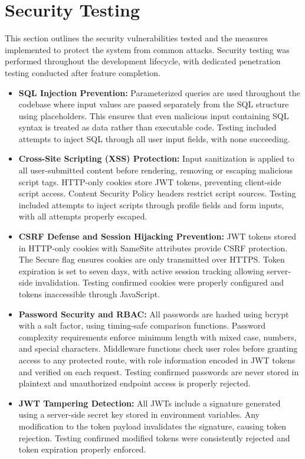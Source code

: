 \section{Security Testing}

\justifying
\noindent This section outlines the security vulnerabilities tested and the measures implemented to protect the system from common attacks. Security testing was performed throughout the development lifecycle, with dedicated penetration testing conducted after feature completion.

\begin{itemize}
    \item \textbf{SQL Injection Prevention:} Parameterized queries are used throughout the codebase where input values are passed separately from the SQL structure using placeholders. This ensures that even malicious input containing SQL syntax is treated as data rather than executable code. Testing included attempts to inject SQL through all user input fields, with none succeeding.

    \item \textbf{Cross-Site Scripting (XSS) Protection:} Input sanitization is applied to all user-submitted content before rendering, removing or escaping malicious script tags. HTTP-only cookies store JWT tokens, preventing client-side script access. Content Security Policy headers restrict script sources. Testing included attempts to inject scripts through profile fields and form inputs, with all attempts properly escaped.

    \item \textbf{CSRF Defense and Session Hijacking Prevention:} JWT tokens stored in HTTP-only cookies with SameSite attributes provide CSRF protection. The Secure flag ensures cookies are only transmitted over HTTPS. Token expiration is set to seven days, with active session tracking allowing server-side invalidation. Testing confirmed cookies were properly configured and tokens inaccessible through JavaScript.

    \item \textbf{Password Security and RBAC:} All passwords are hashed using bcrypt with a salt factor, using timing-safe comparison functions. Password complexity requirements enforce minimum length with mixed case, numbers, and special characters. Middleware functions check user roles before granting access to any protected route, with role information encoded in JWT tokens and verified on each request. Testing confirmed passwords are never stored in plaintext and unauthorized endpoint access is properly rejected.

    \item \textbf{JWT Tampering Detection:} All JWTs include a signature generated using a server-side secret key stored in environment variables. Any modification to the token payload invalidates the signature, causing token rejection. Testing confirmed modified tokens were consistently rejected and token expiration properly enforced.
\end{itemize}

